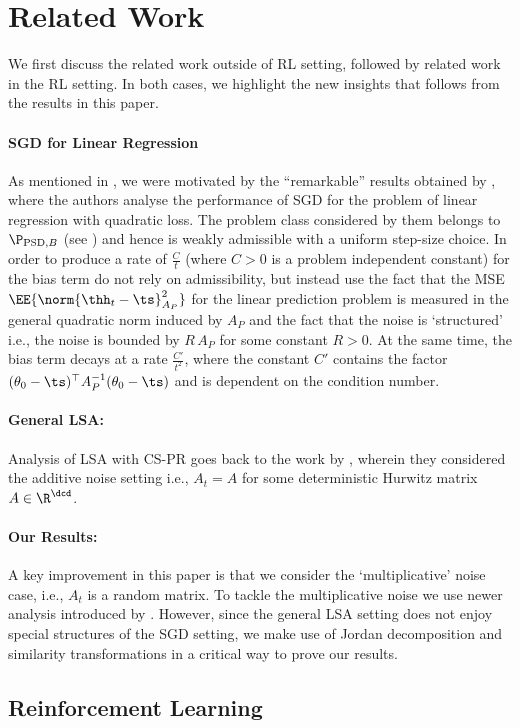 \section{Related Work}
We first discuss the related work outside of RL setting, followed by related work in the RL setting. In both cases, we highlight the new insights that follows from the results in this paper.\par
\paragraph{SGD for Linear Regression} As mentioned in , we were motivated by the ``remarkable'' results obtained by \citet{bach}, where the authors analyse the performance of SGD for the problem of linear regression with quadratic loss. The problem class considered by them belongs to $\P_{\text{PSD},B}$ (see  ) and hence is weakly admissible with a uniform step-size choice. In order to produce a rate of $\frac{C}{t}$ (where $C>0$ is a problem independent constant) for the bias term \citet{bach} do not rely on admissibility, but instead use the fact that the MSE $\EE{\norm{\thh_t-\ts}^2_{A_P}}$ for the linear prediction problem is measured in the general quadratic norm induced by $A_P$ and the fact that the noise is `structured' i.e., the noise is bounded by $R\,A_P$ for some constant $R>0$. At the same time, the bias term decays at a rate $\frac{C'}{t^2}$, where the constant $C'$ contains the factor $(\theta_0-\ts)^\top A^{-1}_P (\theta_0-\ts)$ and is dependent on the condition number.
\paragraph{General LSA:} Analysis of LSA with CS-PR goes back to the work by \citet{polyak-judisky}, wherein they considered the additive noise setting i.e., $A_t=A$ for some deterministic Hurwitz matrix $A\in \R^{\dcd}$.
\paragraph{Our Results:} A key improvement in this paper is that we consider the `multiplicative' noise case, i.e., $A_t$ is a random matrix. To tackle the multiplicative noise we use newer analysis introduced by \citet{bach}. However, since the general LSA setting does not enjoy special structures of the SGD setting, we make use of Jordan decomposition and similarity transformations in a critical way to prove our results.
\subsection{Reinforcement Learning}

